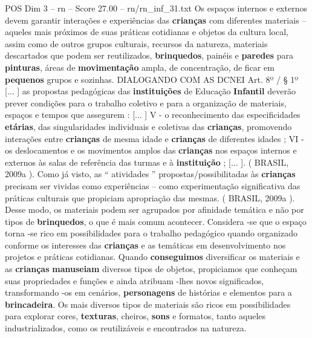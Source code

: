 \begin{textsample}{POS Dim 3 – rn – Score 27.00 – rn/rn\_inf\_31.txt}
Os espaços internos e externos devem garantir interações e experiências das \textbf{crianças} com diferentes materiais – aqueles mais próximos de suas práticas cotidianas e objetos da cultura local, assim como de outros grupos culturais, recursos da natureza, materiais descartados que podem ser reutilizados, \textbf{brinquedos}, painéis e \textbf{paredes} para \textbf{pinturas}, áreas de \textbf{movimentação} ampla, de concentração, de ficar em \textbf{pequenos} grupos e sozinhas.
DIALOGANDO COM AS DCNEI Art. 8º / § 1º [... ] as propostas pedagógicas das \textbf{instituições} de Educação \textbf{Infantil} deverão prever condições para o trabalho coletivo e para a organização de materiais, espaços e tempos que assegurem : [... ] V - o reconhecimento das especificidades \textbf{etárias}, das singularidades individuais e coletivas das \textbf{crianças}, promovendo interações entre \textbf{crianças} de mesma idade e \textbf{crianças} de diferentes idades ; VI - os deslocamentos e os movimentos amplos das \textbf{crianças} nos espaços internos e externos às salas de referência das turmas e à \textbf{instituição} ; [... ]. ( BRASIL, 2009a ).
Como já visto, as “ atividades ” propostas/possibilitadas às \textbf{crianças} precisam ser vividas como experiências – como experimentação significativa das práticas culturais que propiciam apropriação das mesmas. ( BRASIL, 2009a ).
Desse modo, os materiais podem ser agrupados por afinidade temática e não por tipos de \textbf{brinquedos}, o que é mais comum acontecer.
Considera -se que o espaço torna -se rico em possibilidades para o trabalho pedagógico quando organizado conforme os interesses das \textbf{crianças} e as temáticas em desenvolvimento nos projetos e práticas cotidianas.
Quando \textbf{conseguimos} diversificar os materiais e as \textbf{crianças} \textbf{manuseiam} diversos tipos de objetos, propiciamos que conheçam suas propriedades e funções e ainda atribuam -lhes novos significados, transformando -os em cenários, \textbf{personagens} de histórias e elementos para a \textbf{brincadeira}.
Os mais diversos tipos de materiais são ricos em possibilidades para explorar cores, \textbf{texturas}, cheiros, \textbf{sons} e formatos, tanto aqueles industrializados, como os reutilizáveis e encontrados na natureza.

\end{textsample}
